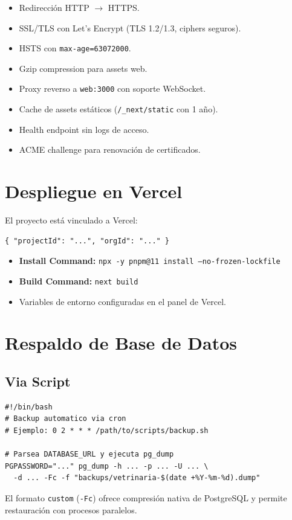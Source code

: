 \begin{itemize}[leftmargin=*]
    \item Redirecci\'on HTTP $\to$ HTTPS.
    \item SSL/TLS con Let's Encrypt (TLS 1.2/1.3, ciphers seguros).
    \item HSTS con \texttt{max-age=63072000}.
    \item Gzip compression para assets web.
    \item Proxy reverso a \texttt{web:3000} con soporte WebSocket.
    \item Cache de assets est\'aticos (\texttt{/\_next/static} con 1 a\~no).
    \item Health endpoint sin logs de acceso.
    \item ACME challenge para renovaci\'on de certificados.
\end{itemize}

\section{Despliegue en Vercel}

El proyecto est\'a vinculado a Vercel:

\begin{lstlisting}[style=json, caption=.vercel/project.json]
{ "projectId": "...", "orgId": "..." }
\end{lstlisting}

\begin{itemize}[leftmargin=*]
    \item \textbf{Install Command:} \texttt{npx -y pnpm@11 install --no-frozen-lockfile}
    \item \textbf{Build Command:} \texttt{next build}
    \item Variables de entorno configuradas en el panel de Vercel.
\end{itemize}

\section{Respaldo de Base de Datos}

\subsection{Via Script}

\begin{lstlisting}[style=bash, caption=scripts/backup.sh]
#!/bin/bash
# Backup automatico via cron
# Ejemplo: 0 2 * * * /path/to/scripts/backup.sh

# Parsea DATABASE_URL y ejecuta pg_dump
PGPASSWORD="..." pg_dump -h ... -p ... -U ... \
  -d ... -Fc -f "backups/vetrinaria-$(date +%Y-%m-%d).dump"
\end{lstlisting}

El formato \texttt{custom} (\texttt{-Fc}) ofrece compresi\'on nativa de
PostgreSQL y permite restauraci\'on con procesos paralelos.
